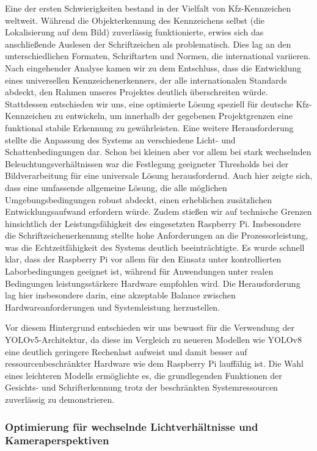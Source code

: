 Eine der ersten Schwierigkeiten bestand in der Vielfalt von Kfz-Kennzeichen weltweit. 
Während die Objekterkennung des Kennzeichens selbst (die Lokalisierung auf dem Bild) zuverlässig funktionierte, erwies sich das anschließende Auslesen der Schriftzeichen als problematisch. 
 Dies lag an den unterschiedlichen Formaten, Schriftarten und Normen, die international variieren. 
 Nach eingehender Analyse kamen wir zu dem Entschluss, dass die Entwicklung eines universellen Kennzeichenerkenners, der alle internationalen Standards abdeckt, den Rahmen unseres Projektes deutlich überschreiten würde. 
 Stattdessen entschieden wir uns, eine optimierte Lösung speziell für deutsche Kfz-Kennzeichen zu entwickeln, um innerhalb der gegebenen Projektgrenzen eine funktional stabile Erkennung zu gewährleisten.\singlespacing
 Eine weitere Herausforderung stellte die Anpassung des Systems an verschiedene Licht- und Schattenbedingungen dar. 
 Schon bei kleinen aber vor allem bei stark wechselnden Beleuchtungsverhältnissen war die Festlegung geeigneter Thresholds bei der Bildverarbeitung für eine universale Lösung herausfordernd. 
 Auch hier zeigte sich, dass eine umfassende allgemeine Lösung, die alle möglichen Umgebungsbedingungen robust abdeckt, einen erheblichen zusätzlichen Entwicklungsaufwand erfordern würde. \singlespacing
 Zudem stießen wir auf technische Grenzen hinsichtlich der Leistungsfähigkeit des eingesetzten Raspberry Pi.
Insbesondere die Schriftzeichenerkennung stellte hohe Anforderungen an die Prozessorleistung, was die Echtzeitfähigkeit des Systems deutlich beeinträchtigte.
Es wurde schnell klar, dass der Raspberry Pi vor allem für den Einsatz unter kontrollierten Laborbedingungen geeignet ist, während für Anwendungen unter realen Bedingungen leistungsstärkere Hardware empfohlen wird.
Die Herausforderung lag hier insbesondere darin, eine akzeptable Balance zwischen Hardwareanforderungen und Systemleistung herzustellen.

Vor diesem Hintergrund entschieden wir uns bewusst für die Verwendung der YOLOv5-Architektur, da diese im Vergleich zu neueren Modellen wie YOLOv8 eine deutlich geringere Rechenlast aufweist und damit besser auf ressourcenbeschränkter Hardware wie dem Raspberry Pi lauffähig ist.
Die Wahl eines leichteren Modells ermöglichte es, die grundlegenden Funktionen der Gesichts- und Schrifterkennung trotz der beschränkten Systemressourcen zuverlässig zu demonstrieren. 
\subsubsection{Optimierung für wechselnde Lichtverhältnisse und Kameraperspektiven}
